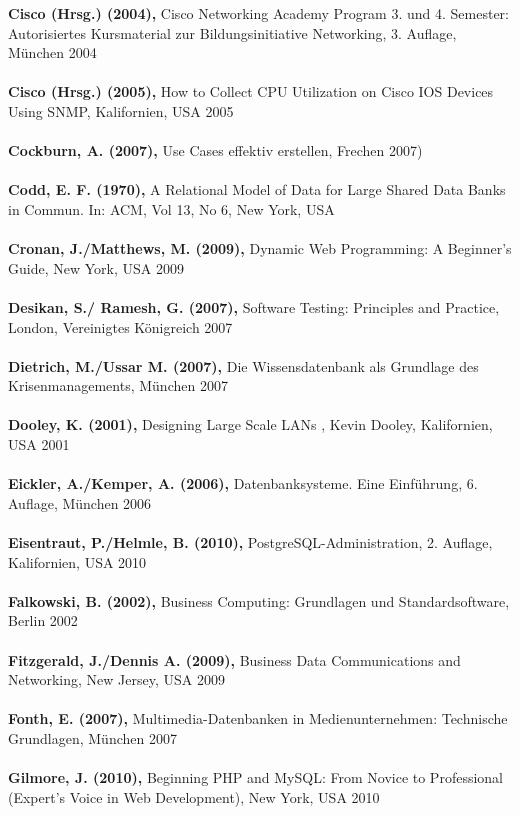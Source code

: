 \clearpage
\textbf{Cisco (Hrsg.) (2004),} Cisco Networking Academy Program 3. und 4. Semester: Autorisiertes Kursmaterial zur Bildungsinitiative Networking, 3. Auflage, München 2004\\\\
\textbf{Cisco (Hrsg.) (2005),} How to Collect CPU Utilization on Cisco IOS Devices Using SNMP, Kalifornien, USA 2005\\\\
\textbf{Cockburn, A. (2007),} Use Cases effektiv erstellen, Frechen 2007)\\\\
\textbf{Codd, E. F. (1970),} A Relational Model of Data for Large Shared Data Banks in Commun. In: ACM, Vol 13, No 6, New York, USA\\\\
\textbf{Cronan, J./Matthews, M. (2009),} Dynamic Web Programming: A Beginner's Guide, New York, USA 2009\\\\
\textbf{Desikan, S./ Ramesh, G. (2007),} Software Testing: Principles and Practice, London, Vereinigtes Königreich 2007\\\\
\textbf{Dietrich, M./Ussar M. (2007),} Die Wissensdatenbank als Grundlage des Krisenmanagements, München 2007\\\\
\textbf{Dooley, K. (2001),} Designing Large Scale LANs , Kevin Dooley, Kalifornien, USA 2001\\\\
\textbf{Eickler, A./Kemper, A. (2006),} Datenbanksysteme. Eine Einführung, 6. Auflage, München 2006\\\\
\textbf{Eisentraut, P./Helmle, B. (2010),} PostgreSQL-Administration, 2. Auflage, Kalifornien, USA 2010\\\\
\textbf{Falkowski, B. (2002),} Business Computing: Grundlagen und Standardsoftware, Berlin 2002\\\\
\textbf{Fitzgerald, J./Dennis A. (2009),} Business Data Communications and Networking, New Jersey, USA 2009\\\\
\textbf{Fonth, E. (2007),} Multimedia-Datenbanken in Medienunternehmen: Technische Grundlagen, München 2007\\\\
\textbf{Gilmore, J. (2010),} Beginning PHP and MySQL: From Novice to Professional (Expert's Voice in Web Development), New York, USA 2010\\\\
